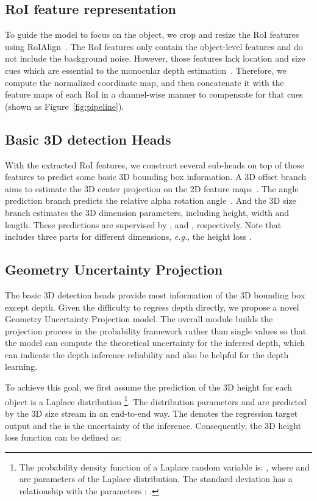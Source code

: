 \documentclass[10pt,twocolumn,letterpaper]{article}
\begin{document}
\subsection{RoI feature representation}
To guide the model to focus on the object, we crop and resize the RoI features using RoIAlign~\cite{he2017mask}.
The RoI features only contain the object-level features and do not include the background noise. 
However, those features lack location and size cues which are essential to the monocular depth estimation~\cite{dijk2019neural}. 
Therefore, we compute the normalized coordinate map, and then concatenate it with the feature maps of each RoI in a channel-wise manner to compensate for that cues (shown as Figure~\ref{fig:pipeline}).




\subsection{Basic 3D detection Heads}
With the extracted RoI features, we construct several sub-heads on top of those features to predict some basic 3D bounding box information. A 3D offset branch aims to estimate the 3D center projection on the 2D feature maps~\cite{chen2020monopair}. The angle prediction branch predicts the relative alpha rotation angle~\cite{mousavian20173d}. And the 3D size branch estimates the 3D dimension parameters, including height, width and length. These predictions are supervised by ,  and , respectively. Note that  includes three parts for different dimensions, \textit{e.g.}, the height loss . 

\subsection{Geometry Uncertainty Projection}
The basic 3D detection heads provide most information of the 3D bounding box except depth. Given the difficulty to regress depth directly, we propose a novel Geometry Uncertainty Projection model. The overall module builds the projection process in the probability framework rather than single values so that the model can compute the theoretical uncertainty for the inferred depth, which can indicate the depth inference reliability and also be helpful for the depth learning. 

To achieve this goal, we first assume the prediction of the 3D height for each object is a Laplace distribution  \footnote{The probability density function of a Laplace random variable  is: ,
where  and  are parameters of the Laplace distribution. The standard deviation  has a relationship with the parameters : . 
}. The distribution parameters  and  are predicted by the 3D size stream in an end-to-end way. The  denotes the regression target output and the  is the uncertainty of the inference. Consequently, the 3D height loss function can be defined as:
\end{document}
